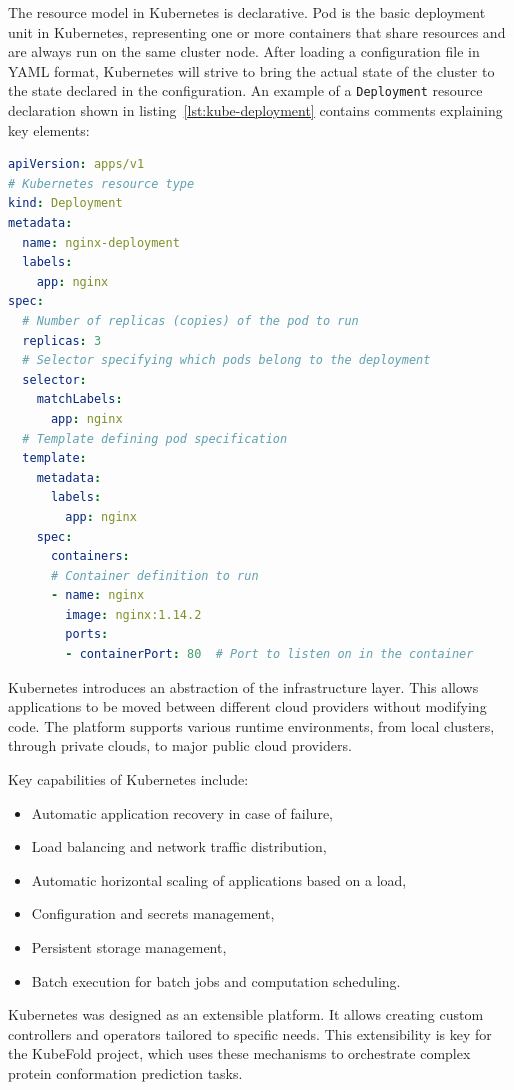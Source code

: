 The resource model in Kubernetes is declarative.
Pod is the basic deployment unit in Kubernetes, representing one or more containers that share resources and are always run on the same cluster node.
After loading a configuration file in YAML format, Kubernetes will strive to bring the actual state of the cluster to the state declared in the configuration.
An example of a \texttt{Deployment} resource declaration shown in listing~\ref{lst:kube-deployment} contains comments explaining key elements:

\begin{lstlisting}[language=yaml,caption={Example Deployment declaration in Kubernetes},label={lst:kube-deployment}]
apiVersion: apps/v1
# Kubernetes resource type
kind: Deployment 
metadata:
  name: nginx-deployment
  labels:
    app: nginx
spec:
  # Number of replicas (copies) of the pod to run
  replicas: 3
  # Selector specifying which pods belong to the deployment
  selector:
    matchLabels:
      app: nginx
  # Template defining pod specification
  template:
    metadata:
      labels:
        app: nginx
    spec:
      containers:
      # Container definition to run
      - name: nginx
        image: nginx:1.14.2
        ports:
        - containerPort: 80  # Port to listen on in the container
\end{lstlisting}

Kubernetes introduces an abstraction of the infrastructure layer.
This allows applications to be moved between different cloud providers without modifying code.
The platform supports various runtime environments, from local clusters, through private clouds, to major public cloud providers.

Key capabilities of Kubernetes include:
\begin{itemize}
    \item Automatic application recovery in case of failure,
    \item Load balancing and network traffic distribution,
    \item Automatic horizontal scaling of applications based on a load,
    \item Configuration and secrets management,
    \item Persistent storage management,
    \item Batch execution for batch jobs and computation scheduling.
\end{itemize}

Kubernetes was designed as an extensible platform.
It allows creating custom controllers and operators tailored to specific needs.
This extensibility is key for the KubeFold project, which uses these mechanisms to orchestrate complex protein conformation prediction tasks.

